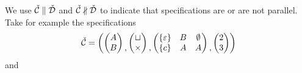 We use $\check{\mathcal{C}} \parallel \check{\mathcal{D}}$ and $\check{\mathcal{C}} \nparallel \check{\mathcal{D}}$ to indicate that specifications are or are not parallel. Take for example the specifications
\[
    \check{\mathcal{C}} = \left(
    \begin{pmatrix}
        A\\B    
    \end{pmatrix}
    \begin{matrix}\\,\end{matrix}
    \begin{pmatrix}
        \sqcup\\
        \times
    \end{pmatrix}
    \begin{matrix}\\,\end{matrix}
    \begin{pmatrix}
        \left\{\varepsilon\right\} & B & \emptyset\\
        \left\{c\right\} & A & A
    \end{pmatrix}
    \begin{matrix}\\,\end{matrix}
    \begin{pmatrix}
        2\\3
    \end{pmatrix}
    \right)
\]
and

